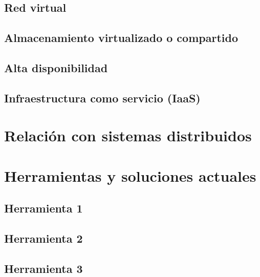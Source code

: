 \documentclass[12pt,a4paper]{article}
\begin{document}
\subsection{Red virtual}

\subsection{Almacenamiento virtualizado o compartido}

\subsection{Alta disponibilidad}

\subsection{Infraestructura como servicio (IaaS)}

\section{Relación con sistemas distribuidos}
\label{sec:relacion}

\section{Herramientas y soluciones actuales}
\label{sec:herramientas}

\subsection{Herramienta 1}

\subsection{Herramienta 2}

\subsection{Herramienta 3}
\end{document}
